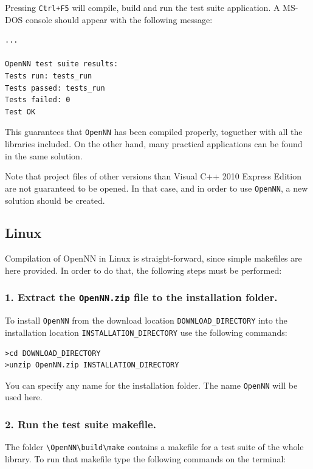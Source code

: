 Pressing \lstinline"Ctrl+F5" will compile, build and run the
test suite application. A MS-DOS console should appear with the following message:

\begin{lstlisting}
...

OpenNN test suite results:
Tests run: tests_run
Tests passed: tests_run
Tests failed: 0
Test OK
\end{lstlisting}

This guarantees that \texttt{OpenNN} has been compiled properly, toguether with all the libraries included.
On the other hand, many practical applications can be found in the same solution. 

Note that project files of other versions than Visual C++ 2010 Express Edition are
not guaranteed to be opened. In that case, and in order to use \texttt{OpenNN}, a new solution should be
created. 


\subsection*{Linux}

Compilation of OpenNN in Linux is straight-forward, since simple makefiles are here provided.
In order to do that, the following steps must be performed:

\subsubsection*{1. Extract the \lstinline"OpenNN.zip" file to the installation
folder.}

To install \texttt{OpenNN} from the download location
\lstinline"DOWNLOAD_DIRECTORY" into the installation location
\lstinline"INSTALLATION_DIRECTORY" use the following commands:

\begin{lstlisting}
>cd DOWNLOAD_DIRECTORY
>unzip OpenNN.zip INSTALLATION_DIRECTORY
\end{lstlisting}

You can specify any name for the installation folder. The name
\lstinline"OpenNN" will be used here. 

\subsubsection*{2. Run the test suite makefile.}

The folder \lstinline"\OpenNN\build\make" contains a 
makefile for a test suite of the whole library.
To run that makefile type the following commands on
the terminal:

